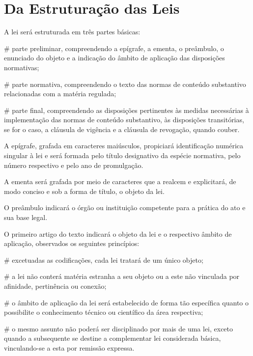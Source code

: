 \documentclass[a4paper,capitulo,titlepage=false]{br-lex}
\begin{document}
\section{Da Estruturação das Leis}

\artigo A lei será estruturada em três partes básicas:

\begin{easylist}
# parte preliminar, compreendendo a epígrafe, a ementa, o preâmbulo, o enunciado do objeto e a indicação do âmbito de aplicação das disposições normativas;

#  parte normativa, compreendendo o texto das normas de conteúdo substantivo relacionadas com a matéria regulada;

#  parte final, compreendendo as disposições pertinentes às medidas necessárias à implementação das normas de conteúdo substantivo, às disposições transitórias, se for o caso, a cláusula de vigência e a cláusula de revogação, quando couber.
\end{easylist}

\artigo A epígrafe, grafada em caracteres maiúsculos, propiciará identificação numérica singular à lei e será formada pelo título designativo da espécie normativa, pelo número respectivo e pelo ano de promulgação.

\artigo A ementa será grafada por meio de caracteres que a realcem e explicitará, de modo conciso e sob a forma de título, o objeto da lei.

\artigo O preâmbulo indicará o órgão ou instituição competente para a prática do ato e sua base legal.

\artigo O primeiro artigo do texto indicará o objeto da lei e o respectivo âmbito de aplicação, observados os seguintes princípios:

\begin{easylist}
#  excetuadas as codificações, cada lei tratará de um único objeto;

#  a lei não conterá matéria estranha a seu objeto ou a este não vinculada por afinidade, pertinência ou conexão;

#  o âmbito de aplicação da lei será estabelecido de forma tão específica quanto o possibilite o conhecimento técnico ou científico da área respectiva;

#  o mesmo assunto não poderá ser disciplinado por mais de uma lei, exceto quando a subsequente se destine a complementar lei considerada básica, vinculando-se a esta por remissão expressa.
\end{easylist}
\end{document}
